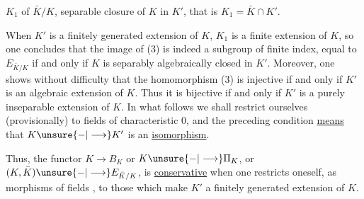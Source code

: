 $K_1$ of $\bar K/K$, separable  closure of $K$ in $K'$, that is $K_1=\bar K\cap K'$.

When $K'$ is a finitely generated extension of $K$, $K_1$ is a finite extension of $K$, so one concludes that the image of (3) is indeed a subgroup of finite index, equal to $E_{\bar K/K}$ if and only if  $K$ is separably algebraically closed in $K'$. Moreover, one shows without difficulty that  the homomorphism (3) is injective if and only if $K'$ is an algebraic extension of $K$. Thus it is bijective if and only if $K'$ is a purely inseparable extension of $K$. In what follows we shall restrict ourselves (provisionally) to fields of characteristic $0$, and the preceding condition \uline{means}  that $K\unsure{-|\longrightarrow}K'$ is an \uline{isomorphism}.

Thus, the functor $K\longrightarrow B_K$ or $K\unsure{-|\longrightarrow}\Pi_K$, or $(K,\bar K)\unsure{-|\longrightarrow}E_{\bar K/K}$, is \uline{conservative} when one restricts oneself, as morphisms of fields , to those  which make $K'$ a finitely generated extension of $K$.
